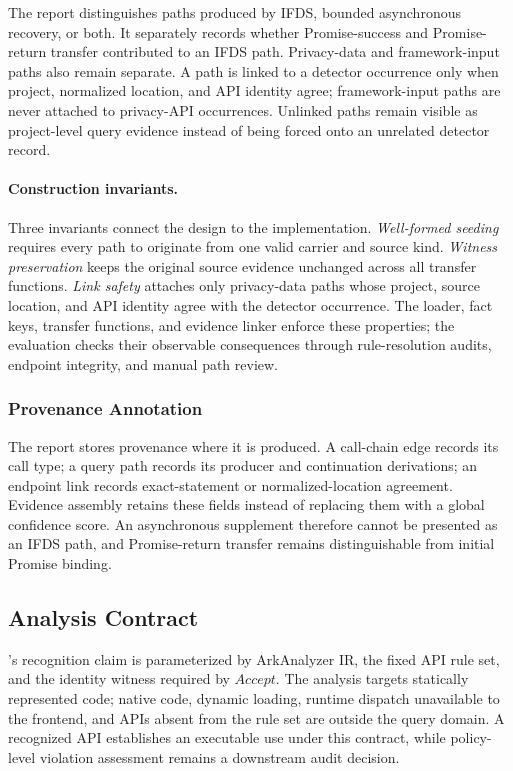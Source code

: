 The report distinguishes paths produced by IFDS, bounded asynchronous recovery, or both. It separately records whether Promise-success and Promise-return transfer contributed to an IFDS path. Privacy-data and framework-input paths also remain separate. A path is linked to a detector occurrence only when project, normalized location, and API identity agree; framework-input paths are never attached to privacy-API occurrences. Unlinked paths remain visible as project-level query evidence instead of being forced onto an unrelated detector record.

\paragraph{Construction invariants.}
Three invariants connect the design to the implementation. \emph{Well-formed seeding} requires every path to originate from one valid carrier and source kind. \emph{Witness preservation} keeps the original source evidence unchanged across all transfer functions. \emph{Link safety} attaches only privacy-data paths whose project, source location, and API identity agree with the detector occurrence. The loader, fact keys, transfer functions, and evidence linker enforce these properties; the evaluation checks their observable consequences through rule-resolution audits, endpoint integrity, and manual path review.

\subsubsection{Provenance Annotation}

The report stores provenance where it is produced. A call-chain edge records its call type; a query path records its producer and continuation derivations; an endpoint link records exact-statement or normalized-location agreement. Evidence assembly retains these fields instead of replacing them with a global confidence score. An asynchronous supplement therefore cannot be presented as an IFDS path, and Promise-return transfer remains distinguishable from initial Promise binding.

\subsection{Analysis Contract}
\label{subsec:analysis_contract}

\mytool's recognition claim is parameterized by ArkAnalyzer IR, the fixed API rule set, and the identity witness required by $\mathit{Accept}$. The analysis targets statically represented \arkts code; native code, dynamic loading, runtime dispatch unavailable to the frontend, and APIs absent from the rule set are outside the query domain. A recognized API establishes an executable use under this contract, while policy-level violation assessment remains a downstream audit decision.

